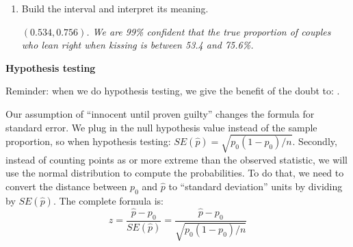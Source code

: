 \begin{enumerate}
\begin{enumerate}
\begin{enumerate}
\begin{key}
  {\it  0.645}
\end{key}
       \item What is the standard error of $\widehat{p}$ for these
         data?   
\begin{students}
        \vspace{.7cm}        
\end{students}

\begin{key}
  {\it  $\sqrt{0.645 * 0.355 / 124} = 0.0430 $}
\end{key}
       \item From the table about two pages back, what $z^*$ values
         goes with 99\% confidence?   
       \end{enumerate}
\begin{students}
        \vspace{.7cm}        
\end{students}

\begin{key}
  {\it  2.576}
\end{key}
       \item Build the interval and interpret its meaning. 
\begin{students}
        \vspace{2in}
\end{students}

\begin{key}
 {\it $(0.534, 0.756)$.  We are 99\% confident that the true
    proportion of couples who lean right when kissing is between 53.4
    and 75.6\%. }
\end{key}
     \end{enumerate}
   \end{enumerate}

   \begin{center}
     {\large\bf   Hypothesis testing }
   \end{center}

 Reminder:  when we do hypothesis testing, we give the benefit
 of the doubt to: \underline{\hspace{1in}}.

 Our assumption of ``innocent until proven guilty'' changes the
 formula for standard error.  We plug in the null hypothesis value
 instead of the sample proportion, so when hypothesis testing: $
 SE(\widehat{p}) = \sqrt{p_0(1-p_0)/n}$. Secondly, instead of counting
 points as or more extreme than the observed statistic, we will use
 the normal distribution to compute the probabilities.  To do that, we
 need to convert the distance between $p_0$ and $\widehat{p}$ to ``standard
 deviation'' units by dividing by $SE(\widehat{p})$.  The complete
 formula is:
  $$ z = \frac{\widehat{p} - p_0}{SE(\widehat{p})} = 
         \frac{\widehat{p} - p_0}{\sqrt{p_0(1-p_0)/n}}$$
   
